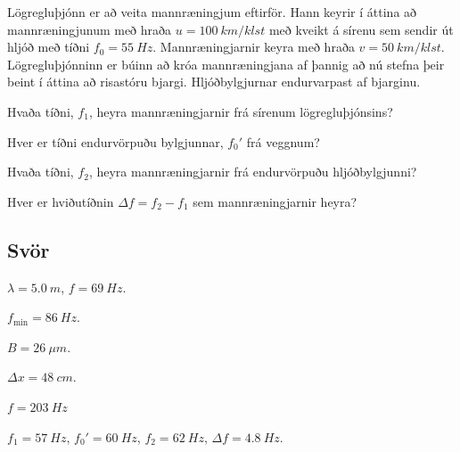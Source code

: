 \ifdefined \wholebook \else\documentclass[oneside]{book}\usepackage{EdlBook}\graphicspath{{figures/}}
\begin{document}
\begin{enumerate}[label = \textbf{Dæmi \thechapter.\arabic*.}]
\begin{minipage}{\linewidth}
\item Lögregluþjónn er að veita mannræningjum eftirför. Hann keyrir í áttina að mannræningjunum með hraða $u = \SI{100}{km/klst}$ með kveikt á sírenu sem sendir út hljóð með tíðni $f_0 = \SI{55}{Hz}$. Mannræningjarnir keyra með hraða $v = \SI{50}{km/klst}$. Lögregluþjónninn er búinn að króa mannræningjana af þannig að nú stefna þeir beint í áttina að risastóru bjargi. Hljóðbylgjurnar endurvarpast af bjarginu. \begin{enumerate*}[label = \textbf{(\alph*)}]
    \item Hvaða tíðni, $f_1$, heyra mannræningjarnir frá sírenum lögregluþjónsins?
    \item Hver er tíðni endurvörpuðu bylgjunnar, $f_0'$ frá veggnum?
    \item Hvaða tíðni, $f_2$, heyra mannræningjarnir frá endurvörpuðu hljóðbylgjunni?
    \item Hver er hviðutíðnin $\Delta f = f_2 - f_1$ sem mannræningjarnir heyra?
\end{enumerate*}  

\end{minipage}

\end{enumerate}

\subsection*{Svör}

\begin{enumerate*}[label = \vspace{0.15cm} \textbf{(\arabic*)}]
    \setcounter{enumi}{35}
  \item $\lambda = \SI{5.0}{m}$, $f = \SI{69}{Hz}$.
  \item $f_{\text{min}} = \SI{86}{Hz}$.
  \item $B = \SI{26}{\mu m}$.
  \item $\Delta x = \SI{48}{cm}$.
  \item $f = \SI{203}{Hz}$
  \item $f_1 = \SI{57}{Hz}$, $f_0' = \SI{60}{Hz}$, $f_2 = \SI{62}{Hz}$, $\Delta f = \SI{4.8}{Hz}$.
\end{enumerate*}


\ifdefined \wholebook \else
 \printindex
\end{document}
